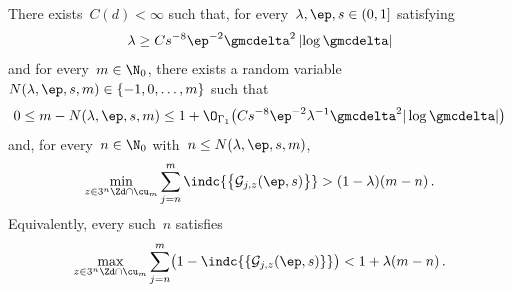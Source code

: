 \documentclass[11pt]{amsart}
\begin{document}
\begin{lemma}
\label{l.min.scale.good.scale}
There exists~$C(d)<\infty$ such that, for every~$\lambda,\ep ,s \in (0,1]$ satisfying
\begin{equation}
	\lambda \geq C s^{-8}   \ep^{-2} \gmcdelta^{2} \left| \log \gmcdelta\right|
	\label{e.holder.induction.smallness}
\end{equation}
and for every~$m \in \N_0$, there exists a random variable~$N(\lambda,\ep,s,m)\in\{-1,0,\ldots,m\}$ such that
\begin{equation}
	0\leq m-N(\lambda,\ep,s,m)
	\leq
	1+\O_{\Gamma_1}\bigl(
	Cs^{-8}\ep^{-2}\lambda^{-1}\gmcdelta^2|\log\gmcdelta|
	\bigr)
	\label{e.N.theta.m.bound.goodscales}
\end{equation}
and, for every~$n \in \N_0$ with~$n \leq N(\lambda,\ep,s,m)$,
\begin{equation}
	\min_{z\in 3^n\Zd \cap \cu_m}
	\sum_{j=n}^{m}
	\indc{\bigl\{ \mathcal{G}_{j,z}(\ep,s) \bigr\}}
	>
	(1-\lambda) (m-n)  \,.
	\label{e.goodscales.minscale}
\end{equation}
Equivalently, every such~$n$ satisfies
\begin{equation*}
	\max_{z\in3^n\Zd\cap\cu_m}
	\sum_{j=n}^m
	\bigl(1-\indc{\{\mathcal G_{j,z}(\ep,s)\}}\bigr)
	<1+\lambda(m-n)\,.
\end{equation*}
\end{lemma}
\end{document}
